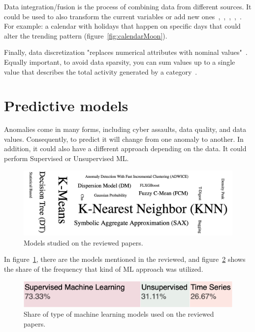 \documentclass[a4paper,12pt,twoside]{ThesisStyle}
\begin{document}
Data integration/fusion is the process of combining data from different sources. It could be used to also transform the current variables or add new ones~\cite{Zhao2017passenger},~\cite{ali2020data},~\cite{Wang2021CAN},~\cite{Zinno2022bridges},~\cite{wu2023gtfs}. For example: a calendar with holidays that happen on specific days that could alter the trending pattern (figure~\ref{fig:calendarMoon}).

Finally, data discretization "replaces numerical attributes with nominal values"~\cite{ali2020data}. Equally important, to avoid data sparsity, you can sum values up to a single value that describes the total activity generated by a category~\cite{Zhu2020cellular}. 

\section{Predictive models}
\label{subcap:predictivemodels}

Anomalies come in many forms, including cyber assaults, data quality, and data values. Consequently, to predict it will change from one anomaly to another. In addition, it could also have a different approach depending on the data. It could perform Supervised or Unsupervised ML.

\begin{figure}[htb]
\centering
\includegraphics[width=13 cm]{imatges/modelsDB.png}
\caption{\label{fig:modelsDB} Models studied on the reviewed papers.}
\end{figure}

In figure~\ref{fig:modelsDB}, there are the models mentioned in the reviewed, and figure~\ref{fig:shareModelsDB} shows the share of the frequency that kind of ML approach was utilized. 

\begin{figure}[htb]
\centering
\includegraphics[width=13 cm]{imatges/shareModelsDB.png}
\caption{\label{fig:shareModelsDB} Share of type of machine learning models used on the reviewed papers.}
\end{figure}
\end{document}

